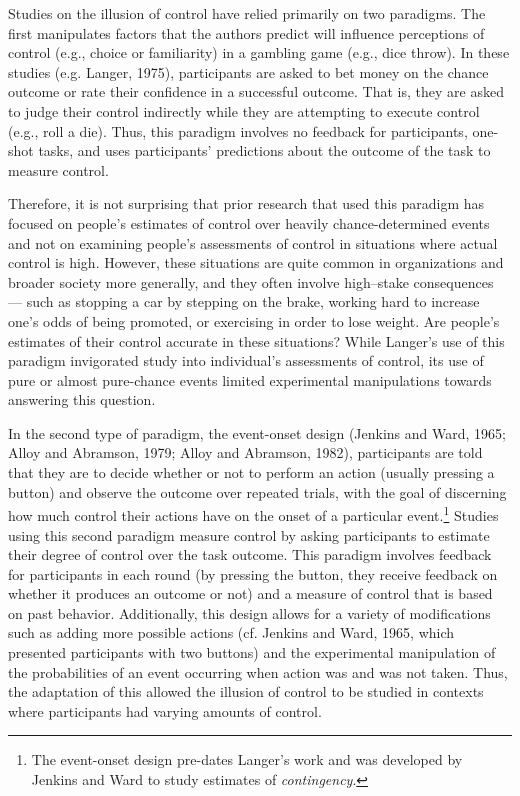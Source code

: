 \documentclass[USenglish,letterpaper,12pt,extrafontsizes,oneside,onecolumn,final]{memoir}
\begin{document}
Studies on the illusion of control have relied primarily on two paradigms. The first manipulates factors that the authors predict will influence perceptions of control (e.g., choice or familiarity) in a gambling game (e.g., dice throw). In these studies (e.g. Langer, 1975), participants are asked to bet money on the chance outcome or rate their confidence in a successful outcome. That is, they are asked to judge their control indirectly while they are attempting to execute control (e.g., roll a die). Thus, this paradigm involves no feedback for participants, one-shot tasks, and uses participants' predictions about the outcome of the task to measure control. 

Therefore, it is not surprising that prior research that used this paradigm has focused on people's estimates of control over heavily chance-determined events and not on examining people's assessments of control in situations where actual control is high. However, these situations are quite common in organizations and broader society more generally, and they often involve high--stake consequences --- such as stopping a car by stepping on the brake, working hard to increase one's odds of being promoted, or exercising in order to lose weight. Are people's estimates of their control accurate in these situations?  While Langer's use of this paradigm invigorated study into individual's assessments of control, its use of pure or almost pure-chance events limited experimental manipulations towards answering this question.  

In the second type of paradigm, the event-onset design (Jenkins and Ward, 1965; Alloy and Abramson, 1979; Alloy and Abramson, 1982), participants are told that they are to decide whether or not to perform an action (usually pressing a button) and observe the outcome over repeated trials, with the goal of discerning how much control their actions have on the onset of a particular event.\footnote{The event-onset design pre-dates Langer's work and was developed by Jenkins and Ward to study estimates of \emph{contingency}.} Studies using this second paradigm measure control by asking participants to estimate their degree of control over the task outcome. This paradigm involves feedback for participants in each round (by pressing the button, they receive feedback on whether it produces an outcome or not) and a measure of control that is based on past behavior. Additionally, this design allows for a variety of modifications such as adding more possible actions (cf. Jenkins and Ward, 1965, which presented participants with two buttons) and the experimental manipulation of the probabilities of an event occurring when action was and was not taken.  Thus, the adaptation of this allowed the illusion of control to be studied in contexts where participants had varying amounts of control.
\end{document}
